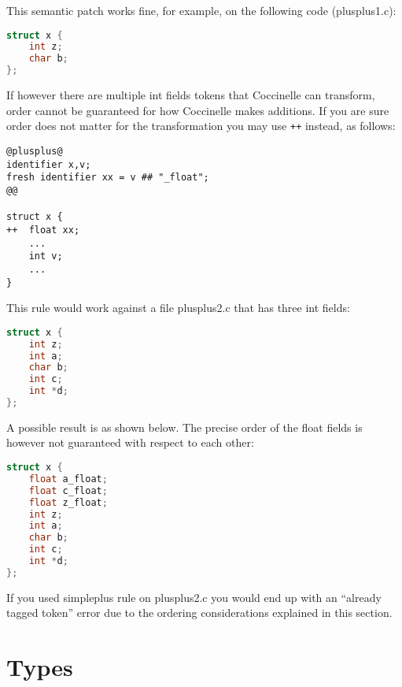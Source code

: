 This semantic patch works fine, for example, on the following code
(plusplus1.c):

\begin{lstlisting}[language=C]
struct x {
	int z;
	char b;
};
\end{lstlisting}

If however there are multiple int fields tokens that Coccinelle
can transform, order cannot be guaranteed for how Coccinelle
makes additions. If you are sure order does not matter for
the transformation you may use \texttt{++} instead, as follows:

\begin{lstlisting}[language=Cocci]
@plusplus@
identifier x,v;
fresh identifier xx = v ## "_float";
@@

struct x {
++	float xx;
	...
	int v;
	...
}
\end{lstlisting}

This rule would work against a file plusplus2.c that has three
int fields:

\begin{lstlisting}[language=C]
struct x {
	int z;
	int a;
	char b;
	int c;
	int *d;
};
\end{lstlisting}

A possible result is as shown below. The precise order of the float fields
is however not guaranteed with respect to each other:

\begin{lstlisting}[language=C]
struct x {
	float a_float;
	float c_float;
	float z_float;
	int z;
	int a;
	char b;
	int c;
	int *d;
};
\end{lstlisting}

If you used simpleplus rule on plusplus2.c you would end up with
an ``already tagged token'' error due to the ordering considerations
explained in this section.

\section{Types}
\label{types}

